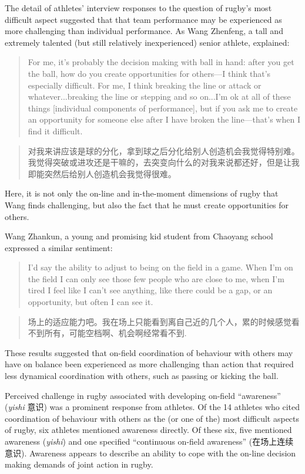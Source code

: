 \begin{CJK}{UTF8}{gbsn}
The detail of athletes' interview responses to the question of rugby's most difficult aspect suggested that  that team performance may be experienced as more challenging than individual performance.
  As Wang Zhenfeng, a tall and extremely talented (but still relatively inexperienced) senior athlete, explained:
            \begin{quote}
            For me, it's probably the decision making with ball in hand: after you get the ball, how do you create opportunities for others---I think that's especially difficult.  For me, I think breaking the line or attack or whatever...breaking the line or stepping and so on...I'm ok at all of these things [individual components of performance], but if you ask me to create an opportunity for someone else after I have broken the line---that's when I find it difficult.
            \end{quote}
            \begin{quote}
            对我来讲应该是球的分化，拿到球之后分化给别人创造机会我觉得特别难。我觉得突破或进攻还是干嘛的，去突变向什么的对我来说都还好，但是让我即能突然后给别人创造机会我觉得很难。
            \end{quote}
Here, it is not only the on-line and in-the-moment dimensions of rugby that Wang finds challenging, but also the fact that he must create opportunities for others.

Wang Zhankun, a young and promising kid student from Chaoyang school expressed a similar sentiment:
          \begin{quote}
          I'd say the ability to adjust to being on the field in a game.  When I'm on the field I can only see those few people who are close to me, when I'm tired I feel like I can't see anything, like there could be a gap, or an opportunity, but often I can see it.
          \end{quote}
          \begin{quote}
          场上的适应能力吧。我在场上只能看到离自己近的几个人，累的时候感觉看不到所有，可能空档啊、机会啊经常看不到.
          \end{quote}
These results suggested that on-field coordination of behaviour with others may have on balance been experienced as more challenging than action that required less dynamical coordination with others, such as passing or kicking the ball.

Perceived challenge in rugby associated with developing on-field ``awareness'' (\textit{yishi} 意识) was a prominent response from athletes.  Of the 14 athletes who cited coordination of behaviour with others as the (or one of the) most difficult aspects of rugby,  six athletes mentioned awareness directly.  Of these six, five mentioned awareness (\textit{yishi}) and one specified ``continuous on-field awareness'' (在场上连续意识).  Awareness appears to describe an ability to cope with the on-line decision making demands of joint action in rugby.


\end{CJK}
